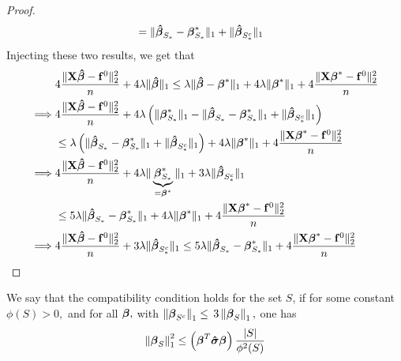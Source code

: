 \begin{proof}
\begin{align*}
         & =  \| \boldsymbol{\hat{\beta}}_{S_{*}}-\boldsymbol{\beta}_{S_{*}}^{*} \|_{1} + \|\boldsymbol{\hat{\beta}}_{S_{*}^{c}} \|_{1}
    \end{align*}
    Injecting these two results, we get that
    \begin{align*}
                 & 4 \frac{\| \mathbf{X} \boldsymbol{\hat{\beta}} - \mathbf{f}^0 \|_{2}^{2}}{n} + 4 \lambda\| \boldsymbol{\hat{\beta}} \|_{1} \leq \lambda \| \boldsymbol{\hat{\beta}} - \boldsymbol{\beta}^* \|_{1} + 4 \lambda \| \boldsymbol{\beta}^*\|_{1} + 4\frac{\|\mathbf{X} \boldsymbol{\beta}^* - \mathbf{f}^0\|_{2}^{2}}{n} \\
        \implies &
        4 \frac{\| \mathbf{X} \boldsymbol{\hat{\beta}} - \mathbf{f}^0 \|_{2}^{2}}{n} + 4 \lambda \left( \|\boldsymbol{\beta}_{S_{*}}^{*} \|_{1} - \|\boldsymbol{\hat{\beta}}_{S_{*}}-\boldsymbol{\beta}_{S_{*}}^{*} \|_{1}+ \|\boldsymbol{\hat{\beta}}_{S_{*}^{c}} \|_{1} \right)                                \\
                 & \leq \lambda \left( \| \boldsymbol{\hat{\beta}}_{S_{*}}-\boldsymbol{\beta}_{S_{*}}^{*} \|_{1} + \|\boldsymbol{\hat{\beta}}_{S_{*}^{c}} \|_{1} \right) + 4 \lambda \| \boldsymbol{\beta}^*\|_{1} + 4\frac{\|\mathbf{X} \boldsymbol{\beta}^* - \mathbf{f}^0\|_{2}^{2}}{n}                    \\
        \implies &
        4 \frac{\| \mathbf{X} \boldsymbol{\hat{\beta}} - \mathbf{f}^0 \|_{2}^{2}}{n} + 4 \lambda \| \underbrace{\boldsymbol{\beta}_{S_{*}}^{*}}_{= \boldsymbol{\beta}^{*}} \|_{1} + 3 \lambda\|\boldsymbol{\hat{\beta}}_{S_{*}^{c}} \|_{1}                                                      \\
                 & \leq 5 \lambda \| \boldsymbol{\hat{\beta}}_{S_{*}}-\boldsymbol{\beta}_{S_{*}}^{*} \|_{1} + 4 \lambda \| \boldsymbol{\beta}^*\|_{1} + 4\frac{\|\mathbf{X} \boldsymbol{\beta}^* - \mathbf{f}^0\|_{2}^{2}}{n}                                                                \\
        \implies &
        4 \frac{\| \mathbf{X} \boldsymbol{\hat{\beta}} - \mathbf{f}^0 \|_{2}^{2}}{n} + 3 \lambda\|\boldsymbol{\hat{\beta}}_{S_{*}^{c}} \|_{1} \leq 5 \lambda \| \boldsymbol{\hat{\beta}}_{S_{*}}-\boldsymbol{\beta}_{S_{*}}^{*} \|_{1} + 4\frac{\|\mathbf{X} \boldsymbol{\beta}^* - \mathbf{f}^0\|_{2}^{2}}{n}           \\
    \end{align*}
\end{proof}


\begin{definition}
    We say that the compatibility condition holds for the set $S$, if for some constant $\phi(S)>0,$ and for all $\boldsymbol{\beta},$ with $\left\|\boldsymbol{\beta}_{S^{c}}\right\|_{1} \leq$ $3\left\|\boldsymbol{\beta}_{S}\right\|_{1},$ one has
    $$
        \left\|\boldsymbol{\beta}_{S}\right\|_{1}^{2} \leq\left(\boldsymbol{\beta}^{T} \boldsymbol{\hat{\sigma}} \boldsymbol{\beta}\right)\frac{|S|}{\phi^{2}(S)}
    $$
\end{definition}

